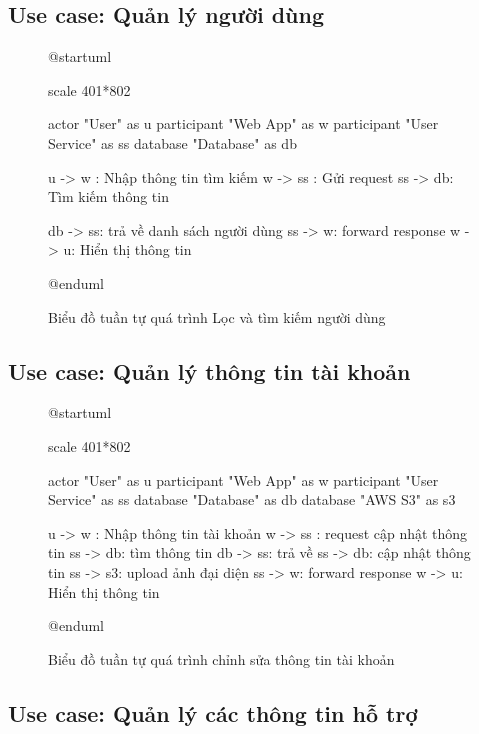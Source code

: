 \documentclass[report.tex]{subfiles}
\begin{document}
\subsection{Use case: Quản lý người dùng}

\begin{figure}[!ht]
\caption{Biểu đồ tuần tự quá trình Lọc và tìm kiếm người dùng}
\begin{plantuml}

@startuml

scale 401*802

actor "User" as u
participant "Web App" as w
participant "User Service" as ss
database "Database" as db

u -> w : Nhập thông tin tìm kiếm
w -> ss : Gửi request
ss -> db: Tìm kiếm thông tin

db -> ss: trả về danh sách người dùng
ss -> w: forward response
w -> u: Hiển thị thông tin 

@enduml
\end{plantuml}
\end{figure}
\FloatBarrier

\subsection{Use case: Quản lý thông tin tài khoản}

\begin{figure}[!ht]
\caption{Biểu đồ tuần tự quá trình chỉnh sửa thông tin tài khoản}
\begin{plantuml}

@startuml

scale 401*802

actor "User" as u
participant "Web App" as w
participant "User Service" as ss
database "Database" as db
database "AWS S3" as s3

u -> w : Nhập thông tin tài khoản
w -> ss : request cập nhật thông tin
ss -> db: tìm thông tin
db -> ss: trả về
ss -> db: cập nhật thông tin
ss -> s3: upload ảnh đại diện
ss -> w: forward response
w -> u: Hiển thị thông tin 

@enduml
\end{plantuml}
\end{figure}
\FloatBarrier

\subsection{Use case: Quản lý các thông tin hỗ trợ}
\end{document}
